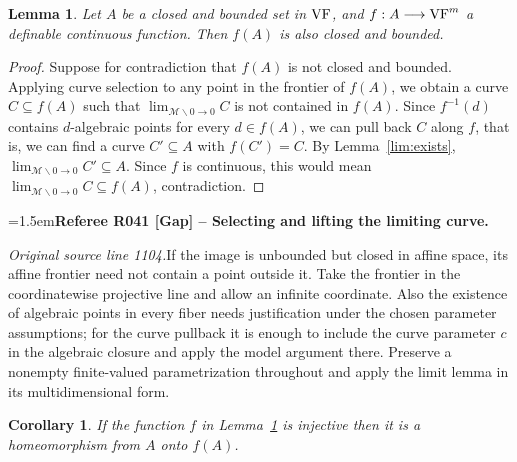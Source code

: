 \documentclass[12pt]{amsart}
\newcommand{\RefereeRemark}[4]{%
  \par\medskip\begingroup\normalfont\small\color{RefereePurple}%
  \emergencystretch=1.5em\noindent\textbf{Referee R#1 [#2] -- #3.}\par\nobreak\noindent #4\par
  \endgroup\medskip
}
\theoremstyle{plain}
\newtheorem{cor}[thm]{Corollary}
\newtheorem{lem}[thm]{Lemma}
\theoremstyle{definition}
\theoremstyle{remark}
\numberwithin{equation}{section}
\theoremstyle{plain}
\newcommand{\VF}{\textup{VF}}
\newcommand{\MM}{\mdl M}
\newcommand{\0}{\emptyset}
\newcommand{\mdl}[1]{\mathcal{#1}}  %
\newcommand{\fun}{\longrightarrow}
\newcommand{\sub}{\subseteq}
\newcommand{\mi}{\smallsetminus}
\DeclareMathOperator{\vv}{val}
\begin{document}


\begin{lem}\label{cb:to:cb}
Let $A$ be a closed and bounded set in $\VF$, and $f : A \fun \VF^m$ a definable continuous function. Then $f(A)$ is also closed and bounded.
\end{lem}
\begin{proof}
Suppose for contradiction that $f(A)$ is not closed and bounded. Applying curve selection to any point in the frontier of $f(A)$,  we obtain a curve $C \sub f(A)$ such that $\lim_{\MM \mi 0 \rightarrow 0} C$ is not contained in $f(A)$. Since $f^{-1}(d)$ contains $d$-algebraic points for every $d \in f(A)$, we can pull back $C$ along $f$, that is, we can find a curve $C '\sub A$ with $f(C') = C$. By Lemma~\ref{lim:exists}, $\lim_{\MM \mi 0 \rightarrow 0} C' \sub A$. Since $f$ is continuous, this would mean $\lim_{\MM \mi 0 \rightarrow 0} C  \sub f(A)$, contradiction.
\end{proof}

\RefereeRemark{041}{Gap}{Selecting and lifting the limiting curve}{%
\textit{Original source line 1104.}\quad If the image is unbounded but closed in affine space, its affine frontier need not contain a point outside it. Take the frontier in the coordinatewise projective line and allow an infinite coordinate. Also the existence of algebraic points in every fiber needs justification under the chosen parameter assumptions; for the curve pullback it is enough to include the curve parameter $c$ in the algebraic closure and apply the model argument there. Preserve a nonempty finite-valued parametrization throughout and apply the limit lemma in its multidimensional form.
}



\begin{cor}\label{conti:homeo}
If the function $f$ in Lemma~\ref{cb:to:cb} is injective then  it is a homeomorphism from $A$ onto $f(A)$.
\end{cor}
\end{document}
